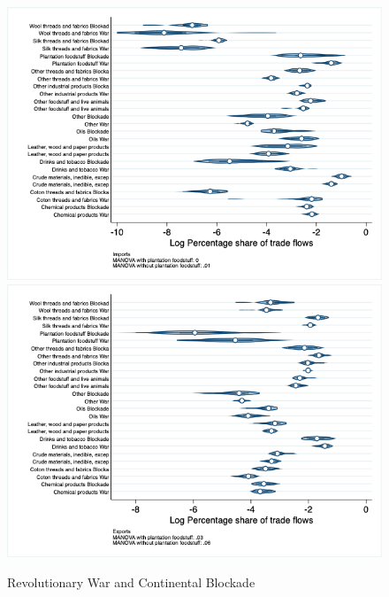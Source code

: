 \documentclass[12pt,a4paper,notitlepage,english]{article}
\begin{document}
\begin{figure}
\centering
\caption{Revolutionary War and Continental Blockade}
\label{rev_block_nat_distr}
\includegraphics[scale=.4]{rev_block_nat_distr_I}
\includegraphics[scale=.4]{rev_block_nat_distr_X}
\end{figure}
\end{document}
